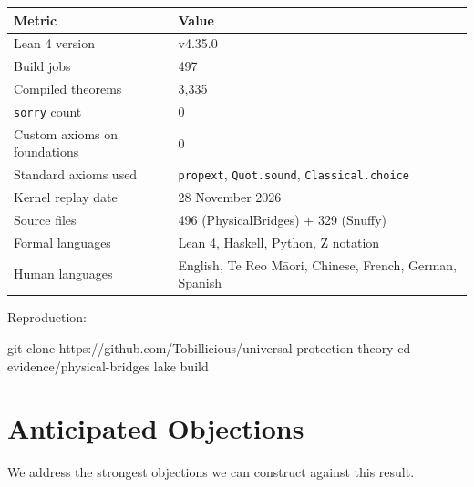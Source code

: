\documentclass[11pt,a4paper]{article}
\theoremstyle{definition}
\theoremstyle{remark}
\begin{document}
\begin{center}
\begin{tabular}{ll}
\toprule
\textbf{Metric} & \textbf{Value} \\
\midrule
Lean 4 version & v4.35.0 \\
Build jobs & 497 \\
Compiled theorems & 3{,}335 \\
\texttt{sorry} count & 0 \\
Custom axioms on foundations & 0 \\
Standard axioms used & \texttt{propext}, \texttt{Quot.sound}, \texttt{Classical.choice} \\
Kernel replay date & 28 November 2026 \\
Source files & 496 (PhysicalBridges) + 329 (Snuffy) \\
Formal languages & Lean 4, Haskell, Python, Z notation \\
Human languages & English, Te Reo M\={a}ori, Chinese, French, German, Spanish \\
\bottomrule
\end{tabular}
\end{center}

Reproduction:
\begin{leancode}
git clone https://github.com/Tobillicious/universal-protection-theory
cd evidence/physical-bridges
lake build
\end{leancode}

\section{Anticipated Objections}\label{sec:objections}

We address the strongest objections we can construct against this result.
\end{document}
